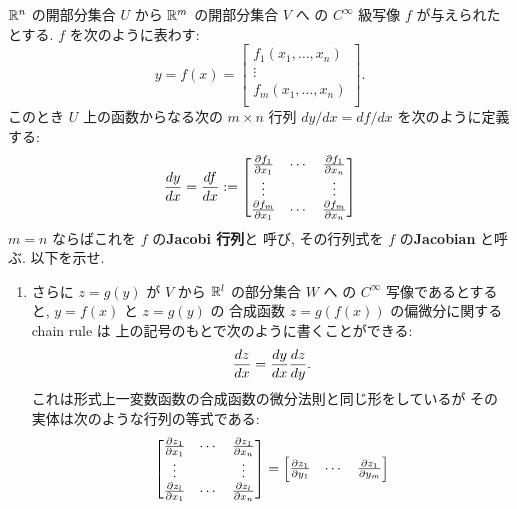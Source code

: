 \documentclass[12pt,twoside]{jarticle}
\begin{document}
\begin{question}[Jacobian]
  \label{q:Jacobian}
  ${\mathbb R}^n$ の開部分集合 $U$ から ${\mathbb R}^m$ の開部分集合 $V$ へ
  の $C^\infty$ 級写像 $f$ が与えられたとする. $f$ を次のように表わす:
  \begin{equation*}
    y = f(x) = 
    \begin{bmatrix}
      f_1(x_1,\ldots,x_n) \\
      \vdots \\
      f_m(x_1,\ldots,x_n) \\
    \end{bmatrix}.
  \end{equation*}
  このとき $U$ 上の函数からなる次の $m\times n$ 行列 $dy/dx=df/dx$ 
  を次のように定義する:
  \begin{equation*}
    \frac{d y}{d x} = \frac{d f}{d x} :=
    \begin{bmatrix}
      \frac{\partial f_1}{\partial x_1} & \cdots & \frac{\partial f_1}{\partial x_n} \\
      \vdots            &        & \vdots \\
      \frac{\partial f_m}{\partial x_1} & \cdots & \frac{\partial f_m}{\partial x_n} \\
    \end{bmatrix}
  \end{equation*}
  $m=n$ ならばこれを $f$ の{\bf Jacobi 行列}と
  呼び, その行列式を $f$ の{\bf Jacobian} と呼ぶ.
  以下を示せ.
  \begin{enumerate}
  \item さらに $z=g(y)$ が $V$ から ${\mathbb R}^l$ の部分集合 $W$ へ
    の $C^\infty$ 写像であるとすると, $y=f(x)$ と $z=g(y)$ の
    合成函数 $z=g(f(x))$ の偏微分に関する chain rule は
    上の記号のもとで次のように書くことができる:
    \begin{equation*}
      \frac{d z}{d x} = \frac{d y}{d x}\frac{d z}{d y}.
    \end{equation*}
    これは形式上一変数函数の合成函数の微分法則と同じ形をしているが
    その実体は次のような行列の等式である:
    \begin{equation*}
      \begin{bmatrix}
        \frac{\partial z_1}{\partial x_1} & \cdots & \frac{\partial z_1}{\partial x_n} \\
        \vdots            &        & \vdots \\
        \frac{\partial z_l}{\partial x_1} & \cdots & \frac{\partial z_l}{\partial x_n} \\
      \end{bmatrix}
      =
      \begin{bmatrix}
        \frac{\partial z_1}{\partial y_1} & \cdots & \frac{\partial z_1}{\partial y_m} \\

\end{bmatrix}
\end{equation*}
\end{enumerate}
\end{question}
\end{document}
